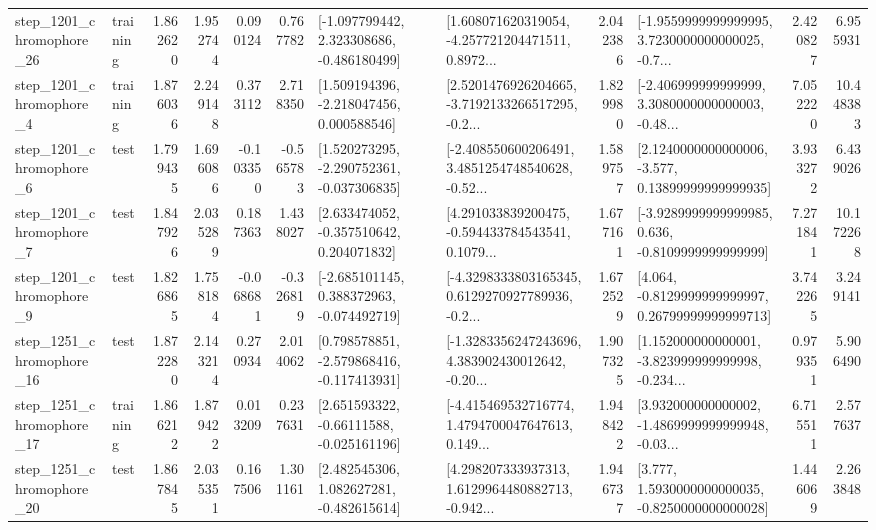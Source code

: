 \begin{tabular}{llrrrrllrlrr}
 step\_1201\_chromophore\_26 &  training &      1.862620 &    1.952744 &      0.090124 &  0.767782 &   [-1.097799442, 2.323308686, -0.486180499] &  [1.608071620319054, -4.257721204471511, 0.8972... &       2.042386 &  [-1.9559999999999995, 3.7230000000000025, -0.7... &            2.420827 &          6.955931 \\
  step\_1201\_chromophore\_4 &  training &      1.876036 &    2.249148 &      0.373112 &  2.718350 &    [1.509194396, -2.218047456, 0.000588546] &  [2.5201476926204665, -3.7192133266517295, -0.2... &       1.829980 &  [-2.406999999999999, 3.3080000000000003, -0.48... &            7.052220 &         10.448383 \\
  step\_1201\_chromophore\_6 &      test &      1.799435 &    1.696086 &     -0.103350 & -0.565783 &   [1.520273295, -2.290752361, -0.037306835] &  [-2.408550600206491, 3.4851254748540628, -0.52... &       1.589757 &  [2.1240000000000006, -3.577, 0.13899999999999935] &            3.933272 &          6.439026 \\
  step\_1201\_chromophore\_7 &      test &      1.847926 &    2.035289 &      0.187363 &  1.438027 &    [2.633474052, -0.357510642, 0.204071832] &  [4.291033839200475, -0.594433784543541, 0.1079... &       1.677161 &  [-3.9289999999999985, 0.636, -0.8109999999999999] &            7.271841 &         10.172268 \\
  step\_1201\_chromophore\_9 &      test &      1.826865 &    1.758184 &     -0.068681 & -0.326819 &   [-2.685101145, 0.388372963, -0.074492719] &  [-4.3298333803165345, 0.6129270927789936, -0.2... &       1.672529 &  [4.064, -0.8129999999999997, 0.26799999999999713] &            3.742265 &          3.249141 \\
 step\_1251\_chromophore\_16 &      test &      1.872280 &    2.143214 &      0.270934 &  2.014062 &   [0.798578851, -2.579868416, -0.117413931] &  [-1.3283356247243696, 4.383902430012642, -0.20... &       1.907325 &  [1.152000000000001, -3.823999999999998, -0.234... &            0.979351 &          5.906490 \\
 step\_1251\_chromophore\_17 &  training &      1.866212 &    1.879422 &      0.013209 &  0.237631 &    [2.651593322, -0.66111588, -0.025161196] &  [-4.415469532716774, 1.4794700047647613, 0.149... &       1.948422 &  [3.932000000000002, -1.4869999999999948, -0.03... &            6.715511 &          2.577637 \\
 step\_1251\_chromophore\_20 &      test &      1.867845 &    2.035351 &      0.167506 &  1.301161 &    [2.482545306, 1.082627281, -0.482615614] &  [4.298207333937313, 1.6129964480882713, -0.942... &       1.946737 &   [3.777, 1.5930000000000035, -0.8250000000000028] &            1.446069 &          2.263848 \\

\end{tabular}
